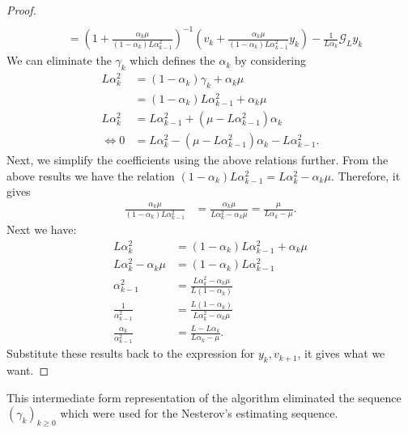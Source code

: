 \documentclass[12pt]{article}
\begin{document}
\begin{proof}
\begin{align*}
            \\
            &= 
            \left(
                1 + \frac{\alpha_k\mu}{(1 -\alpha_k)L\alpha_{k - 1}^2}
            \right)^{-1}
            \left(
                v_k + 
                \frac{\alpha_k\mu}{(1 - \alpha_k)L\alpha_{k - 1}^2} y_k
            \right)
            - \frac{1}{L\alpha_{k}}\mathcal G_L y_k
        \end{align*}
        We can eliminate the $\gamma_k$ which defines the $\alpha_k$ by considering 
        \begin{align*}
            L\alpha_k^2 &= 
            (1 - \alpha_k)\gamma_k + \alpha_k \mu 
            \\
            &= 
            (1 - \alpha_k)L\alpha_{k - 1}^2 
            + \alpha_k \mu
            \\
            L\alpha_k^2 &= 
            L \alpha_{k - 1}^2 + 
            (\mu - L \alpha_{k - 1}^2)\alpha_k
            \\
            \iff     
            0
            &=  
            L \alpha_k^2 - (\mu - L \alpha_{k - 1}^2)\alpha_k 
            - L \alpha_{k -1}^2. 
        \end{align*}
        Next, we simplify the coefficients using the above relations further. 
        From the above results we have the relation $(1 - \alpha_k)L\alpha_{k - 1}^2 = L \alpha_k^2 - \alpha_k \mu$. 
        Therefore,  it gives 
        \begin{align*}
            \frac{\alpha_k\mu}{(1 - \alpha_k)L \alpha_{k - 1}^2}
            &= 
            \frac{\alpha_k\mu}{L \alpha_k^2 - \alpha_k \mu}
            = \frac{\mu}{L \alpha_k - \mu}. 
        \end{align*}
        Next we have: 
        \begin{align*}
            L\alpha_k^2 &= 
            (1 - \alpha_k)L\alpha_{k - 1}^2 + \alpha_k \mu 
            \\
            L \alpha_k^2 - \alpha_k\mu &= 
            (1 - \alpha_k)L \alpha_{k - 1}^2
            \\
            \alpha_{k - 1}^2
            &= 
            \frac{L \alpha_k^2 - \alpha_k\mu}{L (1 - \alpha_k)}
            \\
            \frac{1}{\alpha_{k - 1}^2}
            &= 
            \frac{L (1 - \alpha_k)}{L \alpha_k^2 - \alpha_k\mu}
            \\
            \frac{\alpha_k}{\alpha_{k - 1}^2}
            &= 
            \frac{L - L\alpha_k}{L\alpha_k - \mu}. 
        \end{align*}
        Substitute these results back to the expression for $y_k, v_{k + 1}$, it gives what we want. 

    \end{proof}
    \begin{remark}
        This intermediate form representation of the algorithm eliminated the sequence $(\gamma_k)_{k \ge0}$ which were used for the Nesterov's estimating sequence. 
    \end{remark}
\end{document}
